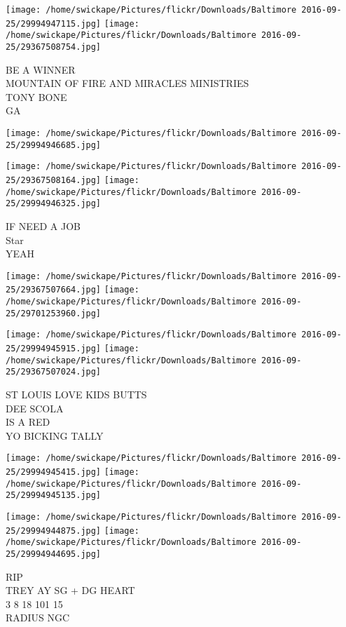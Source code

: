 \documentclass[10pt,letterpaper]{article}
\begin{document}
\texttt{[image: /home/swickape/Pictures/flickr/Downloads/Baltimore 2016-09-25/29994947115.jpg]}
\texttt{[image: /home/swickape/Pictures/flickr/Downloads/Baltimore 2016-09-25/29367508754.jpg]}

BE A WINNER\\
MOUNTAIN OF FIRE AND MIRACLES MINISTRIES\\
TONY BONE\\
GA
\pagebreak

\texttt{[image: /home/swickape/Pictures/flickr/Downloads/Baltimore 2016-09-25/29994946685.jpg]}

\vspace{0.25in}
\texttt{[image: /home/swickape/Pictures/flickr/Downloads/Baltimore 2016-09-25/29367508164.jpg]}
\texttt{[image: /home/swickape/Pictures/flickr/Downloads/Baltimore 2016-09-25/29994946325.jpg]}

IF NEED A JOB\\
Star\\
YEAH
\pagebreak

\texttt{[image: /home/swickape/Pictures/flickr/Downloads/Baltimore 2016-09-25/29367507664.jpg]}
\texttt{[image: /home/swickape/Pictures/flickr/Downloads/Baltimore 2016-09-25/29701253960.jpg]}

\texttt{[image: /home/swickape/Pictures/flickr/Downloads/Baltimore 2016-09-25/29994945915.jpg]}
\texttt{[image: /home/swickape/Pictures/flickr/Downloads/Baltimore 2016-09-25/29367507024.jpg]}

ST LOUIS LOVE KIDS BUTTS\\
DEE SCOLA\\
IS A RED\\
YO BICKING TALLY
\pagebreak

\texttt{[image: /home/swickape/Pictures/flickr/Downloads/Baltimore 2016-09-25/29994945415.jpg]}
\texttt{[image: /home/swickape/Pictures/flickr/Downloads/Baltimore 2016-09-25/29994945135.jpg]}

\texttt{[image: /home/swickape/Pictures/flickr/Downloads/Baltimore 2016-09-25/29994944875.jpg]}
\texttt{[image: /home/swickape/Pictures/flickr/Downloads/Baltimore 2016-09-25/29994944695.jpg]}

RIP\\
TREY AY SG + DG HEART\\
3 8 18 101 15\\
RADIUS NGC
\pagebreak
\end{document}
